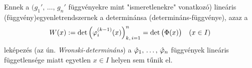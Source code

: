 Ennek a $(g_1', \, \dots, \, g_n'$ függvényekre mint "ismeretlenekre" vonatkozó) lineáris (függvény)egyenletrendszernek a determinánsa (determináns-függvénye), azaz a
\[
	W(x) := \det \Big( \varphi_i^{(k-1)}(x) \Big)_{k, \, i = 1}^n = \det \big( \Phi(x) \big) \quad (x \in I)
\]
leképezés (az ún. \textit{Wronski-determináns}) a $\hat{\varphi}_1, \, \dots, \, \hat{\varphi}_n$ függvények lineáris függetlensége miatt egyetlen $x \in I$ helyen sem tűnik el.



